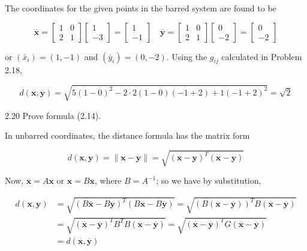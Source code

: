 \documentclass[10pt]{article}
\begin{document}
The coordinates for the given points in the barred system are found to be

$$
\overline{\mathbf{x}}=\left[\begin{array}{ll}
1 & 0 \\
2 & 1
\end{array}\right]\left[\begin{array}{r}
1 \\
-3
\end{array}\right]=\left[\begin{array}{r}
1 \\
-1
\end{array}\right] \quad \overline{\mathbf{y}}=\left[\begin{array}{ll}
1 & 0 \\
2 & 1
\end{array}\right]\left[\begin{array}{r}
0 \\
-2
\end{array}\right]=\left[\begin{array}{r}
0 \\
-2
\end{array}\right]
$$

or $\left(\bar{x}_{i}\right)=(1,-1)$ and $\left(\bar{y}_{i}\right)=(0,-2)$. Using the $g_{i j}$ calculated in Problem 2.18,

$$
d(\overline{\mathbf{x}}, \overline{\mathbf{y}})=\sqrt{5(1-0)^{2}-2 \cdot 2(1-0)(-1+2)+1(-1+2)^{2}}=\sqrt{2}
$$

2.20 Prove formula (2.14).

In unbarred coordinates, the distance formula has the matrix form

$$
d(\mathbf{x}, \mathbf{y})=\|\mathbf{x}-\mathbf{y}\|=\sqrt{(\mathbf{x}-\mathbf{y})^{T}(\mathbf{x}-\mathbf{y})}
$$

Now, $\overline{\mathbf{x}}=A \mathbf{x}$ or $\mathbf{x}=B \overline{\mathbf{x}}$, where $B=A^{-1}$; so we have by substitution,

$$
\begin{aligned}
d(\mathbf{x}, \mathbf{y}) & =\sqrt{(B \overline{\mathbf{x}}-B \overline{\mathbf{y}})^{T}(B \overline{\mathbf{x}}-B \overline{\mathbf{y}})}=\sqrt{(B(\overline{\mathbf{x}}-\overline{\mathbf{y}}))^{T} B(\overline{\mathbf{x}}-\overline{\mathbf{y}})} \\
& =\sqrt{(\overline{\mathbf{x}}-\overline{\mathbf{y}})^{T} B^{T} B(\overline{\mathbf{x}}-\overline{\mathbf{y}})}=\sqrt{(\overline{\mathbf{x}}-\overline{\mathbf{y}})^{T} G(\overline{\mathbf{x}}-\overline{\mathbf{y}})} \\
& =d(\overline{\mathbf{x}}, \overline{\mathbf{y}})
\end{aligned}
$$
\end{document}
